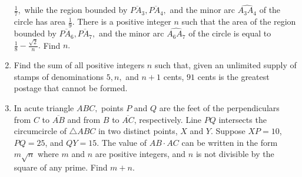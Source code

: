 \documentclass{article}
\begin{document}
\begin{enumerate}[label=\arabic*., itemsep=0.5em]
$\tfrac{1}{7},$ while the region bounded by $\overline{PA_3},\overline{PA_4},$ and the minor arc $\widehat{A_3A_4}$ of the circle has area $\tfrac{1}{9}.$ There is a positive integer $n$ such that the area of the region bounded by $\overline{PA_6},\overline{PA_7},$ and the minor arc $\widehat{A_6A_7}$ of the circle is equal to $\tfrac{1}{8}-\tfrac{\sqrt2}{n}.$ Find $n.$\par \vspace{0.5em}\item Find the sum of all positive integers $n$ such that, given an unlimited supply of stamps of denominations $5,n,$ and $n+1$ cents, $91$ cents is the greatest postage that cannot be formed.\par \vspace{0.5em}\item In acute triangle $ABC,$ points $P$ and $Q$ are the feet of the perpendiculars from $C$ to $\overline{AB}$ and from $B$ to $\overline{AC}$, respectively. Line $PQ$ intersects the circumcircle of $\triangle ABC$ in two distinct points, $X$ and $Y$. Suppose $XP=10$, $PQ=25$, and $QY=15$. The value of $AB\cdot AC$ can be written in the form $m\sqrt n$ where $m$ and $n$ are positive integers, and $n$ is not divisible by the square of any prime. Find $m+n$.




\end{enumerate}
\end{document}
